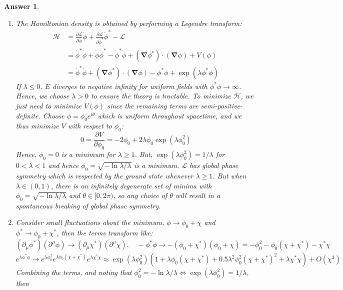 \documentclass[a4paper]{article}
\newtheorem{ans}{Answer}[section]
\theoremstyle{new}
\begin{document}
\newpage
\begin{ans}\leavevmode
\begin{enumerate}[label=(\alph*)]
\item The Hamiltonian density is obtained by performing a Legendre transform:
\begin{align}
    \mathcal{H}&=\frac{\partial\mathcal{L}}{\partial\dot{\phi}}\dot{\phi}+\frac{\partial\mathcal{L}}{\partial\dot{\phi}^*}\dot{\phi}^*-\mathcal{L}\nonumber\\&=\dot{\phi}^*\dot{\phi}+\dot{\phi}\dot{\phi}^*-\dot{\phi}^*\dot{\phi}+(\boldsymbol{\nabla}\phi^*)\cdot(\boldsymbol{\nabla}\phi)+V(\phi)\nonumber\\&=\dot{\phi}^*\dot{\phi}+(\boldsymbol{\nabla}\phi^*)\cdot(\boldsymbol{\nabla}\phi)-\phi^*\phi+\exp(\lambda\phi^*\phi)\nonumber
\end{align}
If $\lambda\leq 0$, $E$ diverges to negative infinity for uniform fields with $\phi^*\phi\rightarrow\infty$. Hence, we choose $\lambda>0$ to ensure the theory is tractable. To minimize $\mathcal{H}$, we just need to minimize $V(\phi)$ since the remaining terms are semi-positive-definite. Choose $\phi=\phi_0e^{i\theta}$ which is uniform throughout spacetime, and we thus minimize $V$ with respect to $\phi_0$:
$$0=\frac{\partial V}{\partial\phi_0}=-2\phi_0+2\lambda\phi_0\exp(\lambda\phi_0^2)$$
Hence, $\phi_0=0$ is a minimum for $\lambda\geq1$. But, $\exp(\lambda\phi_0^2)=1/\lambda$ for $0<\lambda<1$ and hence $\phi_0=\sqrt{-\ln\lambda/\lambda}$ is a minimum. $\mathcal{L}$ has global phase symmetry which is respected by the ground state whenever $\lambda\geq1$. But when $\lambda\in(0,1)$, there is an infinitely degenerate set of minima with $\phi_0=\sqrt{-\ln\lambda/\lambda}$ and $\theta\in[0,2\pi)$, so any choice of $\theta$ will result in a spontaneous breaking of global phase symmetry.
\item Consider small fluctuations about the minimum, $\phi\rightarrow\phi_0+\chi$ and $\phi^*\rightarrow\phi_0+\chi^*$, then the terms transform like:
$$(\partial_\mu\phi^*)(\partial^\mu\phi)\rightarrow(\partial_\mu\chi^*)(\partial^\mu\chi),\quad-\phi^*\phi\rightarrow-(\phi_0+\chi^*)(\phi_0+\chi)=-\phi_0^2-\phi_0(\chi+\chi^*)-\chi^*\chi$$
$$e^{\lambda\phi^*\phi}\rightarrow e^{\lambda\phi_0^2}e^{\lambda\phi_0(\chi+\chi^*)}e^{\lambda\chi^*\chi}\approx\exp(\lambda\phi_0^2)(1+\lambda\phi_0(\chi+\chi^*)+0.5\lambda^2\phi_0^2(\chi+\chi^*)^2+\lambda\chi^*\chi)+O(\chi^3)$$
Combining the terms, and noting that $\phi_0^2=-\ln\lambda/\lambda\iff \exp(\lambda\phi_0^2)=1/\lambda$, then

\end{enumerate}
\end{ans}
\end{document}
